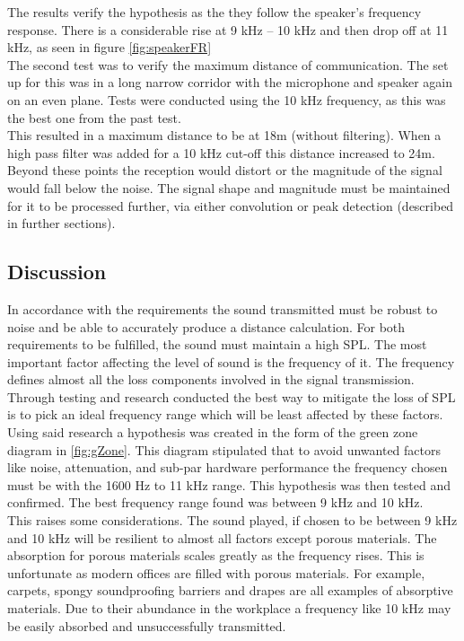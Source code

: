 The results verify the hypothesis as the they follow the speaker’s frequency response. There is a considerable rise at 9 kHz – 10 kHz and then drop off at 11 kHz, as seen in figure \ref{fig:speakerFR} \\

The second test was to verify the maximum distance of communication. The set up for this was in a long narrow corridor with the microphone and speaker again on an even plane. Tests were conducted using the 10 kHz frequency, as this was the best one from the past test. \\

This resulted in a maximum distance to be at 18m (without filtering). When a high pass filter was added for a 10 kHz cut-off this distance increased to 24m. Beyond these points the reception would distort or the magnitude of the signal would fall below the noise. The signal shape and magnitude must be maintained for it to be processed further, via either convolution or peak detection (described in further sections). 

\subsection{Discussion}

In accordance with the requirements the sound transmitted must be robust to noise and be able to accurately produce a distance calculation. For both requirements to be fulfilled, the sound must maintain a high SPL. The most important factor affecting the level of sound is the frequency of it. The frequency defines almost all the loss components involved in the signal transmission. Through testing and research conducted the best way to mitigate the loss of SPL is to pick an ideal frequency range which will be least affected by these factors. \\

Using said research a hypothesis was created in the form of the green zone diagram in \ref{fig:gZone}. This diagram stipulated that to avoid unwanted factors like noise, attenuation, and sub-par hardware performance the frequency chosen must be with the 1600 Hz to 11 kHz range. This hypothesis was then tested and confirmed. The best frequency range found was between 9 kHz and 10 kHz. \\

This raises some considerations. The sound played, if chosen to be between 9 kHz and 10 kHz will be resilient to almost all factors except porous materials. The absorption for porous materials scales greatly as the frequency rises. This is unfortunate as modern offices are filled with porous materials. For example, carpets, spongy soundproofing barriers and drapes are all examples of absorptive materials. Due to their abundance in the workplace a frequency like 10 kHz may be easily absorbed and unsuccessfully transmitted. \\

